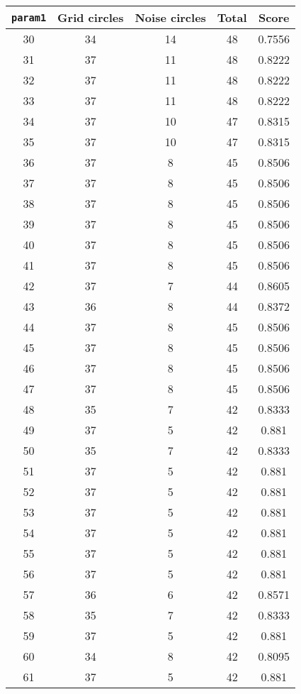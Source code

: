 \documentclass[letterpaper, 12pt]{article}
\begin{document}
\begin{longtable}{|c|c|c|c|c|}
\hline
\textbf{\texttt{param1}} & \textbf{Grid circles} & \textbf{Noise circles} & \textbf{Total} & \textbf{Score} \\
\hline
30 & 34 & 14 & 48 & 0.7556 \\
\hline
31 & 37 & 11 & 48 & 0.8222 \\
\hline
32 & 37 & 11 & 48 & 0.8222 \\
\hline
33 & 37 & 11 & 48 & 0.8222 \\
\hline
34 & 37 & 10 & 47 & 0.8315 \\
\hline
35 & 37 & 10 & 47 & 0.8315 \\
\hline
36 & 37 & 8 & 45 & 0.8506 \\
\hline
37 & 37 & 8 & 45 & 0.8506 \\
\hline
38 & 37 & 8 & 45 & 0.8506 \\
\hline
39 & 37 & 8 & 45 & 0.8506 \\
\hline
40 & 37 & 8 & 45 & 0.8506 \\
\hline
41 & 37 & 8 & 45 & 0.8506 \\
\hline
42 & 37 & 7 & 44 & 0.8605 \\
\hline
43 & 36 & 8 & 44 & 0.8372 \\
\hline
44 & 37 & 8 & 45 & 0.8506 \\
\hline
45 & 37 & 8 & 45 & 0.8506 \\
\hline
46 & 37 & 8 & 45 & 0.8506 \\
\hline
47 & 37 & 8 & 45 & 0.8506 \\
\hline
48 & 35 & 7 & 42 & 0.8333 \\
\hline
49 & 37 & 5 & 42 & 0.881 \\
\hline
50 & 35 & 7 & 42 & 0.8333 \\
\hline
51 & 37 & 5 & 42 & 0.881 \\
\hline
52 & 37 & 5 & 42 & 0.881 \\
\hline
53 & 37 & 5 & 42 & 0.881 \\
\hline
54 & 37 & 5 & 42 & 0.881 \\
\hline
55 & 37 & 5 & 42 & 0.881 \\
\hline
56 & 37 & 5 & 42 & 0.881 \\
\hline
57 & 36 & 6 & 42 & 0.8571 \\
\hline
58 & 35 & 7 & 42 & 0.8333 \\
\hline
59 & 37 & 5 & 42 & 0.881 \\
\hline
60 & 34 & 8 & 42 & 0.8095 \\
\hline
61 & 37 & 5 & 42 & 0.881 \\

\end{longtable}
\end{document}

